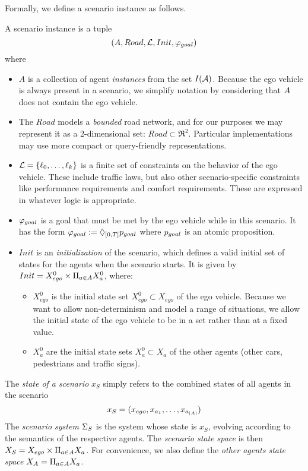 Formally, we define a scenario instance as follows. 
\begin{defn}
	A scenario instance is a tuple 
	\[(A, Road,  \mathcal{L}, Init,  \varphi_{goal})\]
	 where
\begin{itemize}
	\item $A$ is a collection of agent \emph{instances} from the set $I(\mathcal{A})$.
	Because the ego vehicle is always present in a scenario, we simplify notation by considering that $A$ does not contain the ego vehicle.
	\item The $Road$ models a \emph{bounded} road network, and for our purposes we may represent it as a 2-dimensional set: $Road \subset \Re^2$.
	Particular implementations may use more compact or query-friendly representations.
	\item $\mathcal{L} = \{\ell_0,\ldots,\ell_k\}$ is a finite set of constraints on the behavior of the ego vehicle.
	These include traffic laws, but also other scenario-specific constraints like performance requirements and comfort requirements. These are expressed in whatever logic is appropriate.
	\item $\varphi_{goal}$ is a goal that must be met by the ego vehicle while in this scenario. 
	It has the form $\varphi_{goal} := \Diamond_{[0,T]} p_{goal}$ where $p_{goal}$ is an atomic proposition.
	\item $Init$ is an \emph{initialization} of the scenario, which defines a valid initial set of states for the agents when the scenario starts. 
	It is given by $Init = X_{ego}^0 \times \Pi_{a \in A} X_{a}^0$, where:
	\begin{itemize}
		\item $X_{ego}^0$ is the initial state set $X_{ego}^0 \subset X_{ego}$ of the ego vehicle. Because we want to allow non-determinism and model a range of situations, we allow the initial state of the ego vehicle to be in a set rather than at a fixed value.
		\item $X_a^0$ are the initial state sets $X_a^0 \subset X_a$ of the other agents (other cars, pedestrians and traffic signs).
	\end{itemize}
\end{itemize}
The \emph{state of a scenario} $x_S$ simply refers to the combined states of all agents in the scenario
	\[x_S = (x_{ego}, x_{a_1},\ldots,x_{a_{|A|}})\]
The \emph{scenario system} $\Sigma_S$ is the system whose state is $x_S$, evolving according to the semantics of the respective agents.
The \emph{scenario state space} is then $X_S = X_{ego} \times \Pi_{a \in A} X_{a}$.
For convenience, we also define the \emph{other agents state space} $X_A = \Pi_{a \in A} X_{a}$.
\end{defn}


